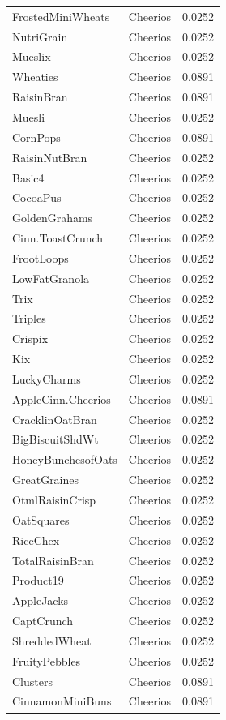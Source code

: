 \begin{longtable}{llr}
FrostedMiniWheats & Cheerios & 0.0252 \\
NutriGrain & Cheerios & 0.0252 \\
Mueslix & Cheerios & 0.0252 \\
Wheaties & Cheerios & 0.0891 \\
RaisinBran & Cheerios & 0.0891 \\
Muesli & Cheerios & 0.0252 \\
CornPops & Cheerios & 0.0891 \\
RaisinNutBran & Cheerios & 0.0252 \\
Basic4 & Cheerios & 0.0252 \\
CocoaPus & Cheerios & 0.0252 \\
GoldenGrahams & Cheerios & 0.0252 \\
Cinn.ToastCrunch & Cheerios & 0.0252 \\
FrootLoops & Cheerios & 0.0252 \\
LowFatGranola & Cheerios & 0.0252 \\
Trix & Cheerios & 0.0252 \\
Triples & Cheerios & 0.0252 \\
Crispix & Cheerios & 0.0252 \\
Kix & Cheerios & 0.0252 \\
LuckyCharms & Cheerios & 0.0252 \\
AppleCinn.Cheerios & Cheerios & 0.0891 \\
CracklinOatBran & Cheerios & 0.0252 \\
BigBiscuitShdWt & Cheerios & 0.0252 \\
HoneyBunchesofOats & Cheerios & 0.0252 \\
GreatGraines & Cheerios & 0.0252 \\
OtmlRaisinCrisp & Cheerios & 0.0252 \\
OatSquares & Cheerios & 0.0252 \\
RiceChex & Cheerios & 0.0252 \\
TotalRaisinBran & Cheerios & 0.0252 \\
Product19 & Cheerios & 0.0252 \\
AppleJacks & Cheerios & 0.0252 \\
CaptCrunch & Cheerios & 0.0252 \\
ShreddedWheat & Cheerios & 0.0252 \\
FruityPebbles & Cheerios & 0.0252 \\
Clusters & Cheerios & 0.0891 \\
CinnamonMiniBuns & Cheerios & 0.0891 \\

\end{longtable}
